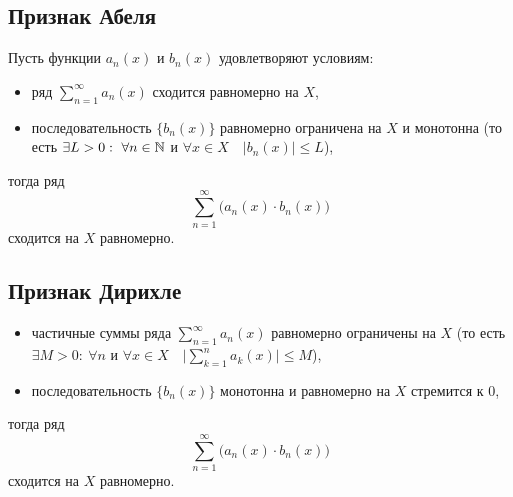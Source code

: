 \subsection{Признак Абеля}

\begin{theorem}\label{theorem:6.9.1}
    Пусть функции $a_n(x)$ и $b_n(x)$ удовлетворяют условиям:
    \begin{itemize}
        \item ряд $\sum_{n=1}^{\infty}a_n(x)$ сходится равномерно на $X$,
        \item последовательность $\big\{b_n(x)\big\}$ равномерно ограничена на $X$ и монотонна (то есть $\exists L > 0: \ \forall n \in \N$ и $\forall x \in X \quad \big|b_n(x)\big| \leqslant L$),
    \end{itemize}
    тогда ряд
    \[
        \sum_{n=1}^{\infty}\big(a_n(x) \cdot b_n(x)\big)
    \]
    сходится на $X$ равномерно.

\end{theorem}

\subsection{Признак Дирихле}

\begin{theorem}\leavevmode
    \begin{itemize}
        \item частичные суммы ряда $\sum_{n=1}^{\infty}a_n(x)$ равномерно ограничены на $X$ (то есть $\exists M > 0: \ \forall n$ и $\forall x \in X \quad \big|\sum_{k=1}^{n}a_k(x)\big| \leqslant M$),
        \item последовательность $ \big\{b_n(x)\big\} $ монотонна и равномерно на $ X $ стремится к $ 0 $,
    \end{itemize}
    тогда ряд
    \[
        \sum_{n=1}^{\infty}\big(a_n(x) \cdot b_n(x)\big)
    \]
    сходится на $X$ равномерно.
\end{theorem}